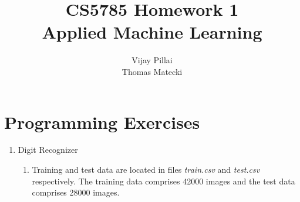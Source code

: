 \documentclass{report}
\begin{document}
\title{CS5785 Homework 1\\
\large{
    Applied Machine Learning
}
}


\author{
	Vijay Pillai\\
	Thomas Matecki}
\maketitle
\section*{Programming Exercises}

\begin{enumerate}
	\item Digit Recognizer
	\begin{enumerate}[label=(\alph*)]
		\item 
		Training and test data are located in files \textit{train.csv} and \textit{test.csv} respectively. The training data comprises 42000 images and the test data comprises 28000 images.


\end{enumerate}
\end{enumerate}
\end{document}

